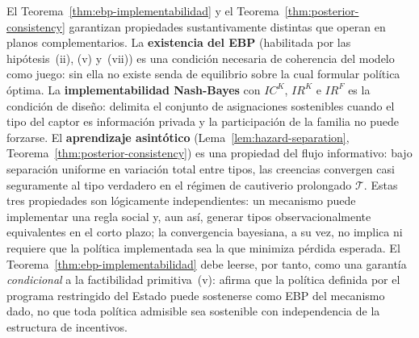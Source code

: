 \documentclass[12pt]{article}
\theoremstyle{definition}
\theoremstyle{remark}
\newcommand{\1}{\mathbf{1}}
\begin{document}
\medskip

\noindent El Teorema~\ref{thm:ebp-implementabilidad} y el Teorema~\ref{thm:posterior-consistency} garantizan propiedades sustantivamente distintas que operan en planos complementarios. La \textbf{existencia del EBP} \textup{(}habilitada por las hipótesis~\textup{(ii)}, \textup{(v)} y~\textup{(vii)}\textup{)} es una condición necesaria de coherencia del modelo como juego: sin ella no existe senda de equilibrio sobre la cual formular política óptima. La \textbf{implementabilidad Nash-Bayes} con $IC^K$, $IR^K$ e $IR^F$ es la condición de diseño: delimita el conjunto de asignaciones sostenibles cuando el tipo del captor es información privada y la participación de la familia no puede forzarse. El \textbf{aprendizaje asintótico} \textup{(}Lema~\ref{lem:hazard-separation}, Teorema~\ref{thm:posterior-consistency}\textup{)} es una propiedad del flujo informativo: bajo separación uniforme en variación total entre tipos, las creencias convergen casi seguramente al tipo verdadero en el régimen de cautiverio prolongado $\mathcal{T}$. Estas tres propiedades son lógicamente independientes: un mecanismo puede implementar una regla social y, aun así, generar tipos observacionalmente equivalentes en el corto plazo; la convergencia bayesiana, a su vez, no implica ni requiere que la política implementada sea la que minimiza pérdida esperada. El Teorema~\ref{thm:ebp-implementabilidad} debe leerse, por tanto, como una garantía \emph{condicional} a la factibilidad primitiva~\textup{(v)}: afirma que la política definida por el programa restringido del Estado puede sostenerse como EBP del mecanismo dado, no que toda política admisible sea sostenible con independencia de la estructura de incentivos.


\end{document}

